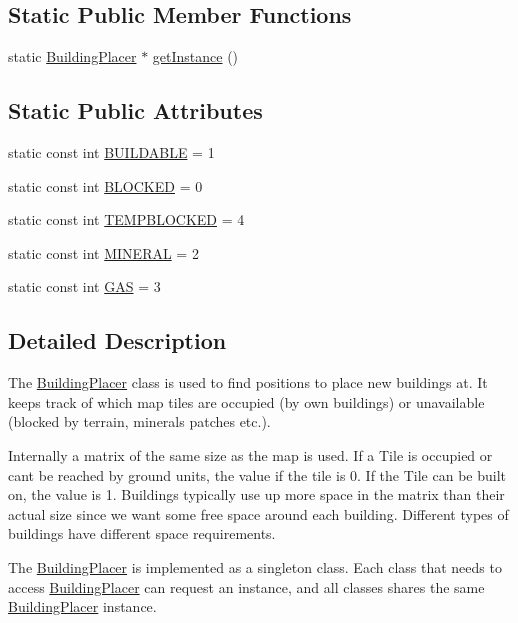 \subsection*{Static Public Member Functions}
\begin{DoxyCompactItemize}
\item 
static \hyperlink{class_building_placer}{Building\-Placer} $\ast$ \hyperlink{class_building_placer_a25e1eb64a53be19c85365df5cbe93563}{get\-Instance} ()
\end{DoxyCompactItemize}
\subsection*{Static Public Attributes}
\begin{DoxyCompactItemize}
\item 
static const int \hyperlink{class_building_placer_ae705dbf64028029a95853e41ef1ef0b5}{B\-U\-I\-L\-D\-A\-B\-L\-E} = 1
\item 
static const int \hyperlink{class_building_placer_aa5f18306d21fd2bc117614a037054f72}{B\-L\-O\-C\-K\-E\-D} = 0
\item 
static const int \hyperlink{class_building_placer_a9979e3cb4ffded872c27d0e89539ee44}{T\-E\-M\-P\-B\-L\-O\-C\-K\-E\-D} = 4
\item 
static const int \hyperlink{class_building_placer_a490d4077d692b82bed675c4604ae6be5}{M\-I\-N\-E\-R\-A\-L} = 2
\item 
static const int \hyperlink{class_building_placer_a0d76281f0d12ca202e87c0715c986c9b}{G\-A\-S} = 3
\end{DoxyCompactItemize}


\subsection{Detailed Description}
The \hyperlink{class_building_placer}{Building\-Placer} class is used to find positions to place new buildings at. It keeps track of which map tiles are occupied (by own buildings) or unavailable (blocked by terrain, minerals patches etc.).

Internally a matrix of the same size as the map is used. If a Tile is occupied or cant be reached by ground units, the value if the tile is 0. If the Tile can be built on, the value is 1. Buildings typically use up more space in the matrix than their actual size since we want some free space around each building. Different types of buildings have different space requirements.

The \hyperlink{class_building_placer}{Building\-Placer} is implemented as a singleton class. Each class that needs to access \hyperlink{class_building_placer}{Building\-Placer} can request an instance, and all classes shares the same \hyperlink{class_building_placer}{Building\-Placer} instance.

